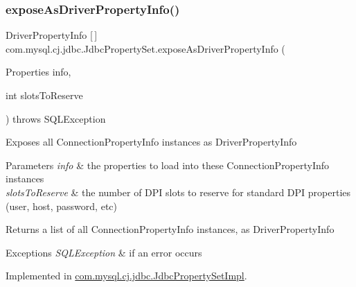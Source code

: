 \subsubsection{\texorpdfstring{expose\+As\+Driver\+Property\+Info()}{exposeAsDriverPropertyInfo()}}
{\footnotesize\ttfamily Driver\+Property\+Info \mbox{[}$\,$\mbox{]} com.\+mysql.\+cj.\+jdbc.\+Jdbc\+Property\+Set.\+expose\+As\+Driver\+Property\+Info (\begin{DoxyParamCaption}\item[{Properties}]{info,  }\item[{int}]{slots\+To\+Reserve }\end{DoxyParamCaption}) throws S\+Q\+L\+Exception}

Exposes all Connection\+Property\+Info instances as Driver\+Property\+Info


\begin{DoxyParams}{Parameters}
{\em info} & the properties to load into these Connection\+Property\+Info instances \\
\hline
{\em slots\+To\+Reserve} & the number of D\+PI slots to reserve for \textquotesingle{}standard\textquotesingle{} D\+PI properties (user, host, password, etc)\\
\hline
\end{DoxyParams}
\begin{DoxyReturn}{Returns}
a list of all Connection\+Property\+Info instances, as Driver\+Property\+Info
\end{DoxyReturn}

\begin{DoxyExceptions}{Exceptions}
{\em S\+Q\+L\+Exception} & if an error occurs \\
\hline
\end{DoxyExceptions}


Implemented in \mbox{\hyperlink{classcom_1_1mysql_1_1cj_1_1jdbc_1_1_jdbc_property_set_impl_a0bcb782acac24d633f1c6b5108102dcd}{com.\+mysql.\+cj.\+jdbc.\+Jdbc\+Property\+Set\+Impl}}.

\mbox{\label{interfacecom_1_1mysql_1_1cj_1_1jdbc_1_1_jdbc_property_set_ab32dd5fed2dd7e715e1d95b0dbc4f587}} 
